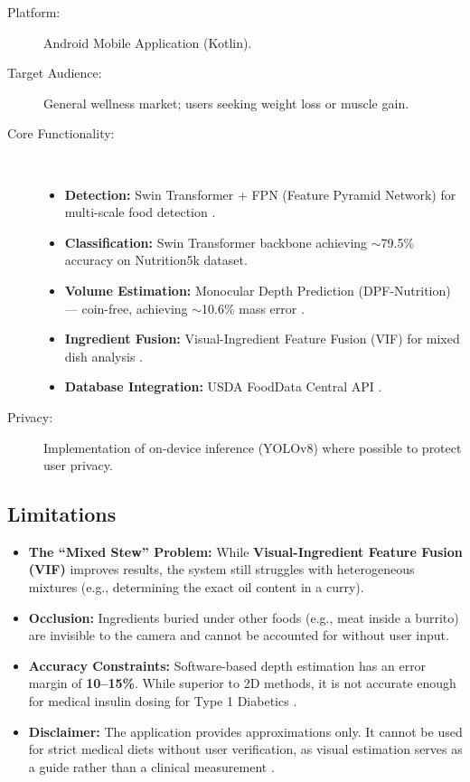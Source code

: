 \documentclass[fleqn,10pt]{SelfArx} %
\begin{document}
\begin{description}
    \item[Platform:] Android Mobile Application (Kotlin).
    \item[Target Audience:] General wellness market; users seeking weight loss or muscle gain.
    \item[Core Functionality:] ~
          \begin{itemize}[noitemsep]
              \item \textbf{Detection:} Swin Transformer + FPN (Feature Pyramid Network) for multi-scale food detection \cite{wang2024swin}.
              \item \textbf{Classification:} Swin Transformer backbone achieving $\sim$79.5\% accuracy on Nutrition5k dataset.
              \item \textbf{Volume Estimation:} Monocular Depth Prediction (DPF-Nutrition) --- coin-free, achieving $\sim$10.6\% mass error \cite{han2023dpf}.
              \item \textbf{Ingredient Fusion:} Visual-Ingredient Feature Fusion (VIF) for mixed dish analysis \cite{qi2025vif}.
              \item \textbf{Database Integration:} USDA FoodData Central API \cite{usdafooddata2024}.
          \end{itemize}
    \item[Privacy:] Implementation of on-device inference (YOLOv8) where possible to protect user privacy.
\end{description}

\subsection{Limitations}

\begin{itemize}[noitemsep]
    \item \textbf{The ``Mixed Stew'' Problem:} While \textbf{Visual-Ingredient Feature Fusion (VIF)} \cite{qi2025vif} improves results, the system still struggles with heterogeneous mixtures (e.g., determining the exact oil content in a curry).

    \item \textbf{Occlusion:} Ingredients buried under other foods (e.g., meat inside a burrito) are invisible to the camera and cannot be accounted for without user input.

    \item \textbf{Accuracy Constraints:} Software-based depth estimation has an error margin of \textbf{10--15\%}. While superior to 2D methods, it is not accurate enough for medical insulin dosing for Type 1 Diabetics \cite{han2023dpf}.

    \item \textbf{Disclaimer:} The application provides approximations only. It cannot be used for strict medical diets without user verification, as visual estimation serves as a guide rather than a clinical measurement \cite{ailawyer2024}.
\end{itemize}
\end{document}
